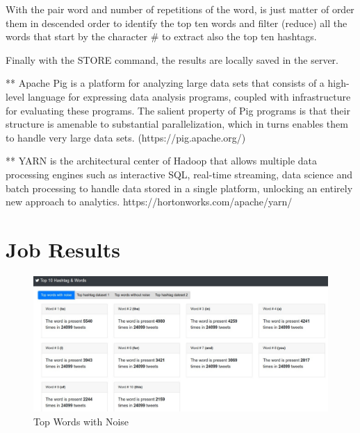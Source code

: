 \documentclass{article}
\newcommand*\setcaptioncitation[1]{\def\captioncitation{\textit{Source:}~#1}}
\let\captioncitation\relax
\begin{document}
        With the pair word and number of repetitions of the word, is just matter of order them in descended order to identify the top ten words and filter (reduce) all the words that start by the character \# to 
        extract also the top ten hashtags.

        Finally with the STORE command, the results are locally saved in the server.

        ** Apache Pig is a platform for analyzing large data sets that consists of a high-level language for expressing data analysis programs, coupled with infrastructure for evaluating these programs. 
        The salient property of Pig programs is that their structure is amenable to substantial parallelization, which in turns enables them to handle very large data sets. 
        (https://pig.apache.org/)

        ** YARN is the architectural center of Hadoop that allows multiple data processing engines such as interactive SQL, real-time streaming, data science and batch processing to handle data stored 
        in a single platform, unlocking an entirely new approach to analytics.
        https://hortonworks.com/apache/yarn/
        \section{Job Results}
		\pagebreak  
		\begin{figure}[H]
            \centering 
            \includegraphics[width=1\linewidth]{./img/topwordswithnoise.jpeg}
            \setcaptioncitation{self-made}
            \caption{Top Words with Noise}
            \label{fig: Top Words with Noise}
        \end{figure}
        
\end{document}

